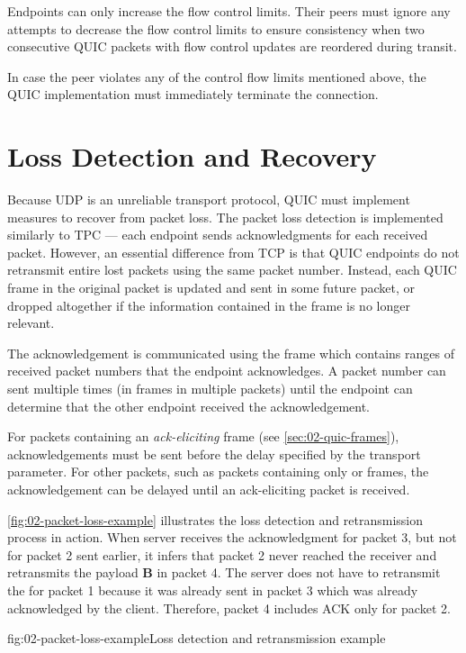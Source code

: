Endpoints can only increase the flow control limits. Their peers must ignore any attempts to
decrease the flow control limits to ensure consistency when two consecutive QUIC packets with flow
control updates are reordered during transit.

In case the peer violates any of the control flow limits mentioned above, the QUIC implementation
must immediately terminate the connection.

\section{Loss Detection and Recovery}

Because UDP is an unreliable transport protocol, QUIC must implement measures to recover from packet
loss. The packet loss detection is implemented similarly to TPC --- each endpoint sends
acknowledgments for each received packet. However, an essential difference from TCP is that QUIC
endpoints do not retransmit entire lost packets using the same packet number. Instead, each QUIC
frame in the original packet is updated and sent in some future packet, or dropped altogether if the
information contained in the frame is no longer relevant.

The acknowledgement is communicated using the \ACK{} frame which contains ranges of received packet
numbers that the endpoint acknowledges. A packet number can sent multiple times (in \ACK{} frames in
multiple packets) until the endpoint can determine that the other endpoint received the
acknowledgement.

For packets containing an \textit{ack-eliciting} frame (see \autoref{sec:02-quic-frames}),
acknowledgements must be sent before the delay specified by the \MaxAckDelay{} transport
parameter. For other packets, such as packets containing only \ACK{} or \PADDING{} frames, the
acknowledgement can be delayed until an ack-eliciting packet is received.

\autoref{fig:02-packet-loss-example} illustrates the loss detection and retransmission process in
action. When server receives the acknowledgment for packet 3, but not for packet 2 sent earlier, it
infers that packet 2 never reached the receiver and retransmits the payload \textbf{B} in packet 4.
The server does not have to retransmit the \ACK{} for packet 1 because it was already sent in packet
3 which was already acknowledged by the client. Therefore, packet 4 includes ACK only for packet 2.

\begin{myFigure}{fig:02-packet-loss-example}{Loss detection and retransmission example}



\end{myFigure}

